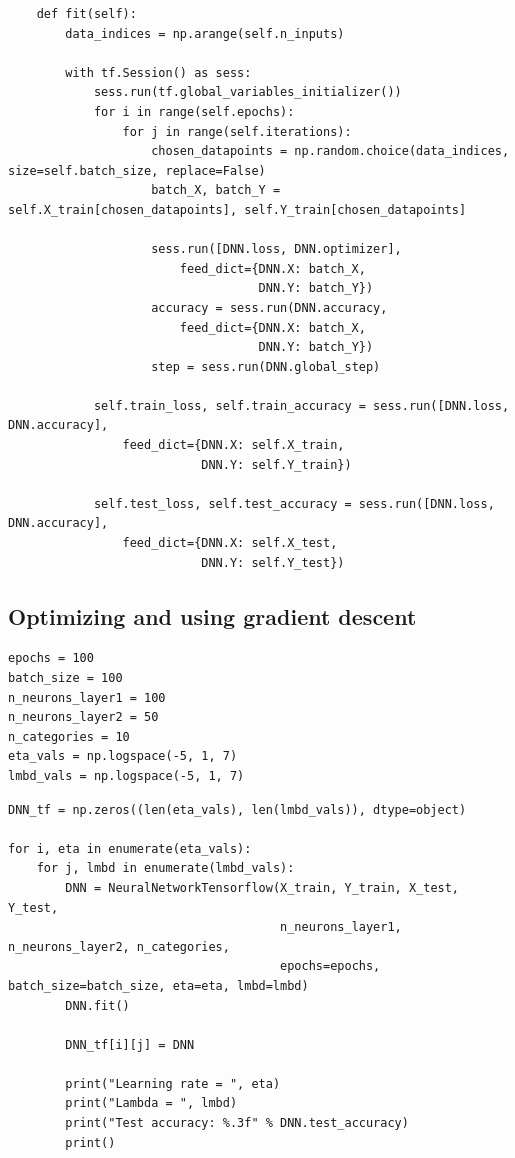 \documentclass[%
oneside,                 %
final,                   %
10pt]{article}
\begin{document}
\begin{verbatim}
    def fit(self):
        data_indices = np.arange(self.n_inputs)

        with tf.Session() as sess:
            sess.run(tf.global_variables_initializer())
            for i in range(self.epochs):
                for j in range(self.iterations):
                    chosen_datapoints = np.random.choice(data_indices, size=self.batch_size, replace=False)
                    batch_X, batch_Y = self.X_train[chosen_datapoints], self.Y_train[chosen_datapoints]
            
                    sess.run([DNN.loss, DNN.optimizer],
                        feed_dict={DNN.X: batch_X,
                                   DNN.Y: batch_Y})
                    accuracy = sess.run(DNN.accuracy,
                        feed_dict={DNN.X: batch_X,
                                   DNN.Y: batch_Y})
                    step = sess.run(DNN.global_step)
    
            self.train_loss, self.train_accuracy = sess.run([DNN.loss, DNN.accuracy],
                feed_dict={DNN.X: self.X_train,
                           DNN.Y: self.Y_train})
        
            self.test_loss, self.test_accuracy = sess.run([DNN.loss, DNN.accuracy],
                feed_dict={DNN.X: self.X_test,
                           DNN.Y: self.Y_test})
\end{verbatim}


\subsection*{Optimizing and using gradient descent}

\begin{verbatim}
epochs = 100
batch_size = 100
n_neurons_layer1 = 100
n_neurons_layer2 = 50
n_categories = 10
eta_vals = np.logspace(-5, 1, 7)
lmbd_vals = np.logspace(-5, 1, 7)
\end{verbatim}


\begin{verbatim}
DNN_tf = np.zeros((len(eta_vals), len(lmbd_vals)), dtype=object)
        
for i, eta in enumerate(eta_vals):
    for j, lmbd in enumerate(lmbd_vals):
        DNN = NeuralNetworkTensorflow(X_train, Y_train, X_test, Y_test,
                                      n_neurons_layer1, n_neurons_layer2, n_categories,
                                      epochs=epochs, batch_size=batch_size, eta=eta, lmbd=lmbd)
        DNN.fit()
        
        DNN_tf[i][j] = DNN
        
        print("Learning rate = ", eta)
        print("Lambda = ", lmbd)
        print("Test accuracy: %.3f" % DNN.test_accuracy)
        print()
\end{verbatim}
\end{document}
